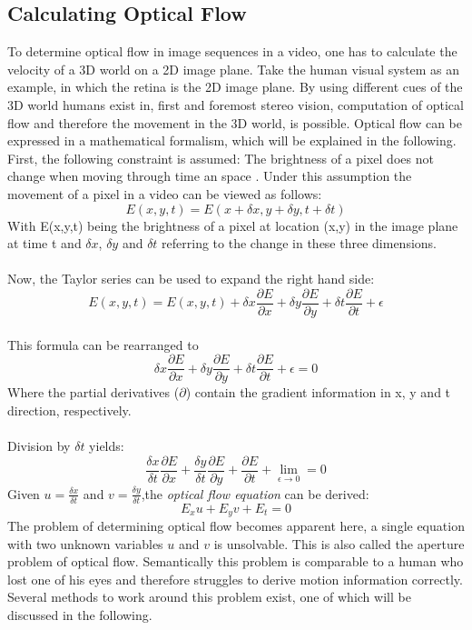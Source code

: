 \documentclass[Bachelorarbeit.tex]{subfiles}
\begin{document}
\subsection{Calculating Optical Flow}
To determine optical flow in image sequences in a video, one has to calculate the velocity of a 3D world on a 2D image plane. Take the human visual system as an example, in which the retina is the 2D image plane. By using different cues of the 3D world humans exist in, first and foremost stereo vision, computation of optical flow and therefore the movement in the 3D world, is possible.
Optical flow can be expressed in a mathematical formalism, which will be explained in the following. First, the following constraint is assumed: The brightness of a pixel does not change when moving through time an space \citep[p.187]{horn1981determining}. 
Under this assumption the movement of a pixel in a video can be viewed as follows:
\begin{equation}
E(x,y,t) = E(x + \delta x, y + \delta y, t + \delta t)
\end{equation}
With E(x,y,t) being the brightness of a pixel at location (x,y) in the image plane at time t and $\delta x$, $\delta y$ and $\delta t$ referring to the change in these three dimensions. \\ \\
Now, the Taylor series can be used to expand the right hand side:
\begin{equation*}
E(x,y,t) = E(x,y,t) + \delta x \frac{\partial E}{\partial x} + \delta y \frac{\partial E}{\partial y} + \delta t \frac{\partial E}{\partial t} + \epsilon
\end{equation*}
\\This formula can be rearranged to\\
\begin{equation*}
\delta x \frac{\partial E}{\partial x} + \delta y \frac{\partial E}{\partial y} + \delta t \frac{\partial E}{\partial t} + \epsilon = 0
\end{equation*}
Where the partial derivatives ($\partial$) contain the gradient information in x, y and t direction, respectively.\\
\\Division by $\delta t$ yields:\\
\begin{equation*}
\frac{\delta x}{\delta t} \frac{\partial E}{\partial x} + \frac{\delta y}{\delta t} \frac{\partial E}{\partial y} + \frac{\partial E}{\partial t} + \displaystyle{\lim_{\epsilon \to 0}} = 0 
\end{equation*}
Given $u = \frac{\delta x}{\delta t}$ and $v = \frac{\delta y}{\delta t}$,the \textit{optical flow equation} can be derived:
\begin{equation}
\label{optfloweq}
E_x u + E_y v + E_t = 0
\end{equation}
The problem of determining optical flow becomes apparent here, a single equation with two unknown variables $u$ and $v$ is unsolvable. This is also called the aperture problem of optical flow. Semantically this problem is comparable to a human who lost one of his eyes and therefore struggles to derive motion information correctly. Several methods to work around this problem exist, one of which will be discussed in the following.
\end{document}
